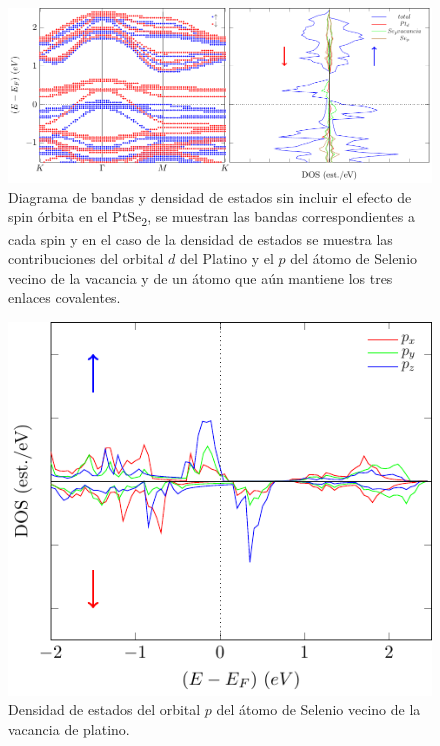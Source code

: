 \begin{figure}[!hbt]
	\centering
	\includegraphics[scale=0.9]{figRes/PtSe2/def/bandas/nosoc/bandasDOSnoSoc.pdf}
	\caption[Diagrama de bandas y densidad de estados del PtSe\textsubscript{2} con vacancia de Platino.]{Diagrama de bandas y densidad de estados sin incluir el efecto de spin \'orbita en el PtSe\textsubscript{2}, se muestran las bandas correspondientes a cada spin y en el caso de la densidad de estados se muestra las contribuciones del orbital $d$ del Platino y el $p$ del \'atomo de Selenio vecino de la vacancia y de un \'atomo que a\'un mantiene los tres enlaces covalentes.}
	\label{Sim:fig:bandDefPtse2noSOC}
\end{figure}

\begin{figure}[!hbt]
	\centering
	\includegraphics[scale=0.9]{figRes/PtSe2/def/bandas/nosoc/pdosS_neg.pdf}
	\caption[Densidad de estados proyectado en el orbital $p$ del \'atomo de Selenio en el PtSe\textsubscript{2} con vacancia de Platino.]{Densidad de estados del orbital $p$ del \'atomo de Selenio vecino de la vacancia de platino.}
	\label{Sim:fig:pdosSeptse2vac}
\end{figure} 

